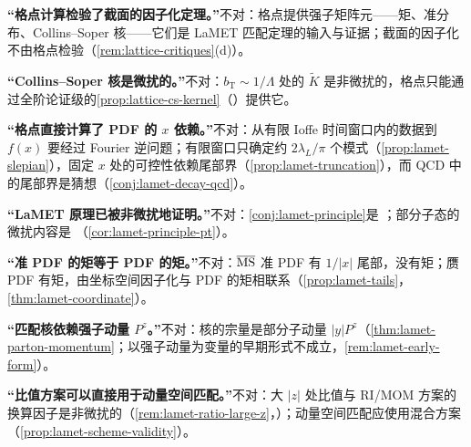 \begin{tcolorbox}[enhanced,breakable,title=本章澄清的常见误解,fonttitle=\bfseries,
  colback=gray!3!white,colframe=gray!55!black,boxrule=0.6pt,arc=2pt,
  left=5pt,right=5pt,top=3pt,bottom=3pt,before skip=6pt,after skip=6pt]
\textbf{“格点计算检验了截面的因子化定理。”}不对：格点提供强子矩阵元——矩、准分布、Collins--Soper 核——它们是 LaMET 匹配定理的输入与证据；截面的因子化不由格点检验（\cref{rem:lattice-critiques}(d)）。\par
\textbf{“Collins--Soper 核是微扰的。”}不对：$b_{\mathrm T}\sim1/\Lambda$ 处的 $\tilde K$ 是非微扰的，格点只能通过全阶论证级的\cref{prop:lattice-cs-kernel}（\tagA）提供它。\par
\textbf{“格点直接计算了 PDF 的 $x$ 依赖。”}不对：从有限 Ioffe 时间窗口内的数据到 $f(x)$ 要经过 Fourier 逆问题；有限窗口只确定约 $2\lambda_L/\pi$ 个模式（\cref{prop:lamet-slepian}），固定 $x$ 处的可控性依赖尾部界（\cref{prop:lamet-truncation}），而 QCD 中的尾部界是猜想（\cref{conj:lamet-decay-qcd}）。\par
\textbf{“LaMET 原理已被非微扰地证明。”}不对：\cref{conj:lamet-principle}是 \tagC；部分子态的微扰内容是 \tagA（\cref{cor:lamet-principle-pt}）。\par
\textbf{“准 PDF 的矩等于 PDF 的矩。”}不对：$\overline{\mathrm{MS}}$ 准 PDF 有 $1/|x|$ 尾部，没有矩；赝 PDF 有矩，由坐标空间因子化与 PDF 的矩相联系（\cref{prop:lamet-tails}，\cref{thm:lamet-coordinate}）。\par
\textbf{“匹配核依赖强子动量 $P^z$。”}不对：核的宗量是部分子动量 $|y|P^z$（\cref{thm:lamet-parton-momentum}；以强子动量为变量的早期形式不成立，\cref{rem:lamet-early-form}）。\par
\textbf{“比值方案可以直接用于动量空间匹配。”}不对：大 $|z|$ 处比值与 RI/MOM 方案的换算因子是非微扰的（\cref{rem:lamet-ratio-large-z}，\tagC）；动量空间匹配应使用混合方案（\cref{prop:lamet-scheme-validity}）。
\end{tcolorbox}

